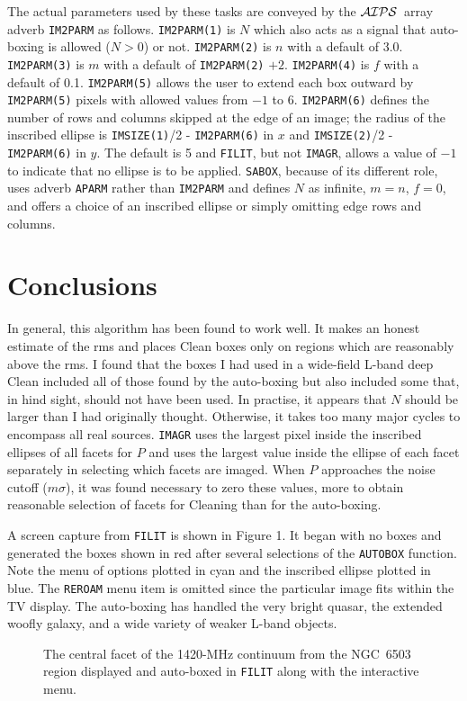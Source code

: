 \documentclass[twoside]{article}
\newcommand{\AIPS}{{$\cal AIPS\/$}}
\begin{document}
The actual parameters used by these tasks are conveyed by the \AIPS\
array adverb {\tt IM2PARM} as follows.  {\tt IM2PARM(1)} is $N$ which
also acts as a signal that auto-boxing is allowed ($N > 0$) or not.
{\tt IM2PARM(2)} is $n$ with a default of 3.0.  {\tt IM2PARM(3)} is $m$
with a default of {\tt IM2PARM(2)} $+ 2$.  {\tt IM2PARM(4)} is $f$
with a default of 0.1.  {\tt IM2PARM(5)} allows the user to extend
each box outward by {\tt IM2PARM(5)} pixels with allowed values from
$-1$ to 6.  {\tt IM2PARM(6)} defines the number of rows and columns
skipped at the edge of an image; the radius of the inscribed ellipse
is {\tt IMSIZE(1)}/2 - {\tt IM2PARM(6)} in $x$ and  {\tt IMSIZE(2)}/2
- {\tt IM2PARM(6)} in $y$.  The default is 5 and {\tt FILIT}, but not
{\tt IMAGR}, allows a value of $-1$ to indicate that no ellipse is to
be applied.  {\tt SABOX}, because of its different role, uses adverb
{\tt APARM} rather than {\tt IM2PARM} and defines $N$ as infinite, $m
= n$, $f = 0$, and offers a choice of an inscribed ellipse or simply
omitting edge rows and columns.

\section{Conclusions}

In general, this algorithm has been found to work well.  It makes an
honest estimate of the rms and places Clean boxes only on regions
which are reasonably above the rms.  I found that the boxes I had used
in a wide-field L-band deep Clean included all of those found by the
auto-boxing but also included some that, in hind sight, should not
have been used.  In practise, it appears that $N$ should be larger
than I had originally thought.  Otherwise, it takes too many major
cycles to encompass all real sources.  {\tt IMAGR} uses the largest
pixel inside the inscribed ellipses of all facets for $P$ and uses the
largest value inside the ellipse of each facet separately in selecting
which facets are imaged.  When $P$ approaches the noise cutoff ($m
\sigma$), it was found necessary to zero these values, more to obtain
reasonable selection of facets for Cleaning than for the auto-boxing.

A screen capture from {\tt FILIT} is shown in Figure 1.  It began with
no boxes and generated the boxes shown in red after several selections
of the {\tt AUTOBOX} function.  Note the menu of options plotted in
cyan and the inscribed ellipse plotted in blue.  The {\tt REROAM} menu
item is omitted since the particular image fits within the TV display.
The auto-boxing has handled the very bright quasar, the extended
woofly galaxy, and a wide variety of weaker L-band objects.

\begin{figure}
\centering
{}
\caption{The central facet of the 1420-MHz continuum from the NGC~6503
  region displayed and auto-boxed in {\tt FILIT} along with the
  interactive menu.}
\end{figure}
\end{document}
